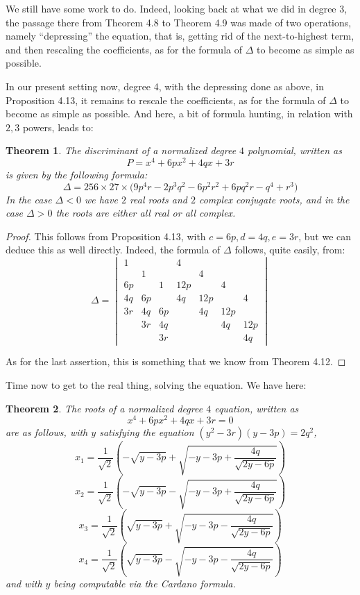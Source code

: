 \documentclass[12pt]{amsbook}
\newtheorem{theorem}{Theorem}[chapter]
\begin{document}
We still have some work to do. Indeed, looking back at what we did in degree 3, the passage there from Theorem 4.8 to Theorem 4.9 was made of two operations, namely ``depressing'' the equation, that is, getting rid of the next-to-highest term, and then rescaling the coefficients, as for the formula of $\Delta$ to become as simple as possible. 

\bigskip

In our present setting now, degree 4, with the depressing done as above, in Proposition 4.13, it remains to rescale the coefficients, as for the formula of $\Delta$ to become as simple as possible. And here, a bit of formula hunting, in relation with $2,3$ powers, leads to:

\begin{theorem}
The discriminant of a normalized degree $4$ polynomial, written as
$$P=x^4+6px^2+4qx+3r$$ 
is given by the following formula:
$$\Delta=256\times27\times\big(9p^4r-2p^3q^2-6p^2r^2+6pq^2r-q^4+r^3\big)$$
In the case $\Delta<0$ we have $2$ real roots and $2$ complex conjugate roots, and in the case $\Delta>0$ the roots are either all real or all complex.
\end{theorem}

\begin{proof}
This follows from Proposition 4.13, with $c=6p,d=4q,e=3r$, but we can deduce this as well directly. Indeed, the formula of $\Delta$ follows, quite easily, from:
$$\Delta
=\begin{vmatrix}
1&&&4\\
&1&&&4\\
6p&&1&12p&&4\\
4q&6p&&4q&12p&&4\\
3r&4q&6p&&4q&12p&\\
&3r&4q&&&4q&12p\\
&&3r&&&&4q
\end{vmatrix}$$

As for the last assertion, this is something that we know from Theorem 4.12.
\end{proof}

Time now to get to the real thing, solving the equation. We have here:


\begin{theorem}
The roots of a normalized degree $4$ equation, written as
$$x^4+6px^2+4qx+3r=0$$ 
are as follows, with $y$ satisfying the equation $(y^2-3r)(y-3p)=2q^2$,
$$x_1=\frac{1}{\sqrt{2}}\left(-\sqrt{y-3p}+\sqrt{-y-3p+\frac{4q}{\sqrt{2y-6p}}}\right)$$
$$x_2=\frac{1}{\sqrt{2}}\left(-\sqrt{y-3p}-\sqrt{-y-3p+\frac{4q}{\sqrt{2y-6p}}}\right)$$
$$x_3=\frac{1}{\sqrt{2}}\left(\sqrt{y-3p}+\sqrt{-y-3p-\frac{4q}{\sqrt{2y-6p}}}\right)$$
$$x_4=\frac{1}{\sqrt{2}}\left(\sqrt{y-3p}-\sqrt{-y-3p-\frac{4q}{\sqrt{2y-6p}}}\right)$$
and with $y$ being computable via the Cardano formula.
\end{theorem}
\end{document}
